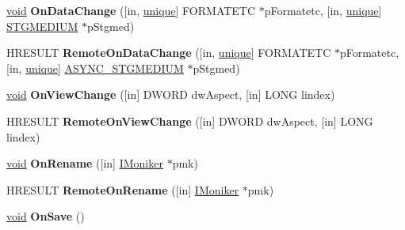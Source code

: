 \begin{DoxyCompactItemize}
\item 
\mbox{\label{interface_i_advise_sink_acd6cb2b043c09027417b8bc320c5149a}} 
\hyperlink{interfacevoid}{void} {\bfseries On\+Data\+Change} (\mbox{[}in, \hyperlink{interfaceunique}{unique}\mbox{]} F\+O\+R\+M\+A\+T\+E\+TC $\ast$p\+Formatetc, \mbox{[}in, \hyperlink{interfaceunique}{unique}\mbox{]} \hyperlink{struct_i_advise_sink_1_1tag_s_t_g_m_e_d_i_u_m}{S\+T\+G\+M\+E\+D\+I\+UM} $\ast$p\+Stgmed)
\item 
\mbox{\label{interface_i_advise_sink_abfa165e2d94722a10c45e2d1cd9b9f21}} 
H\+R\+E\+S\+U\+LT {\bfseries Remote\+On\+Data\+Change} (\mbox{[}in, \hyperlink{interfaceunique}{unique}\mbox{]} F\+O\+R\+M\+A\+T\+E\+TC $\ast$p\+Formatetc, \mbox{[}in, \hyperlink{interfaceunique}{unique}\mbox{]} \hyperlink{struct_i_advise_sink_1_1tag_s_t_g_m_e_d_i_u_m}{A\+S\+Y\+N\+C\+\_\+\+S\+T\+G\+M\+E\+D\+I\+UM} $\ast$p\+Stgmed)
\item 
\mbox{\label{interface_i_advise_sink_a8393cc7d2bd057293f6492eff7c78cc8}} 
\hyperlink{interfacevoid}{void} {\bfseries On\+View\+Change} (\mbox{[}in\mbox{]} D\+W\+O\+RD dw\+Aspect, \mbox{[}in\mbox{]} L\+O\+NG lindex)
\item 
\mbox{\label{interface_i_advise_sink_a17db7488d2b16c52443256d14d460b8f}} 
H\+R\+E\+S\+U\+LT {\bfseries Remote\+On\+View\+Change} (\mbox{[}in\mbox{]} D\+W\+O\+RD dw\+Aspect, \mbox{[}in\mbox{]} L\+O\+NG lindex)
\item 
\mbox{\label{interface_i_advise_sink_a9ffcd53662e7bc17c7177ec0355880f7}} 
\hyperlink{interfacevoid}{void} {\bfseries On\+Rename} (\mbox{[}in\mbox{]} \hyperlink{interface_i_moniker}{I\+Moniker} $\ast$pmk)
\item 
\mbox{\label{interface_i_advise_sink_a9102912487ec794ab0f0e3af241e4210}} 
H\+R\+E\+S\+U\+LT {\bfseries Remote\+On\+Rename} (\mbox{[}in\mbox{]} \hyperlink{interface_i_moniker}{I\+Moniker} $\ast$pmk)
\item 
\mbox{\label{interface_i_advise_sink_aa2bfd27d1afeed5ce7763ed51cf97e70}} 
\hyperlink{interfacevoid}{void} {\bfseries On\+Save} ()

\end{DoxyCompactItemize}

